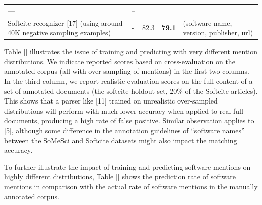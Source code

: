 \documentclass[
]{article}
\begin{document}
\begin{longtable}[]{@{}lllll@{}}
\begin{minipage}[t]{0.18\columnwidth}
---\strut
\end{minipage} & \begin{minipage}[t]{0.12\columnwidth}\raggedright
--\strut
\end{minipage}\tabularnewline
\begin{minipage}[t]{0.18\columnwidth}\raggedright
Softcite recognizer {[}17{]} (using around 40K negative sampling
examples)\strut
\end{minipage} & \begin{minipage}[t]{0.18\columnwidth}\raggedright
-\strut
\end{minipage} & \begin{minipage}[t]{0.18\columnwidth}\raggedright
82.3\strut
\end{minipage} & \begin{minipage}[t]{0.18\columnwidth}\raggedright
\textbf{79.1}\strut
\end{minipage} & \begin{minipage}[t]{0.12\columnwidth}\raggedright
(software name, version, publisher, url)\strut
\end{minipage}\tabularnewline
\bottomrule
\end{longtable}

Table {[}{]} illustrates the issue of training and predicting with very
different mention distributions. We indicate reported scores based on
cross-evaluation on the annotated corpus (all with over-sampling of
mentions) in the first two columns. In the third column, we report
realistic evaluation scores on the full content of a set of annotated
documents (the softcite holdout set, 20\% of the Softcite articles).
This shows that a parser like {[}11{]} trained on unrealistic
over-sampled distributions will perform with much lower accuracy when
applied to real full documents, producing a high rate of false positive.
Similar observation applies to {[}5{]}, although some difference in the
annotation guidelines of ``software names'' between the SoMeSci and
Softcite datasets might also impact the matching accuracy.

To further illustrate the impact of training and predicting software
mentions on highly different distributions, Table {[}{]} shows the
prediction rate of software mentions in comparison with the actual rate
of software mentions in the manually annotated corpus.
\end{document}
